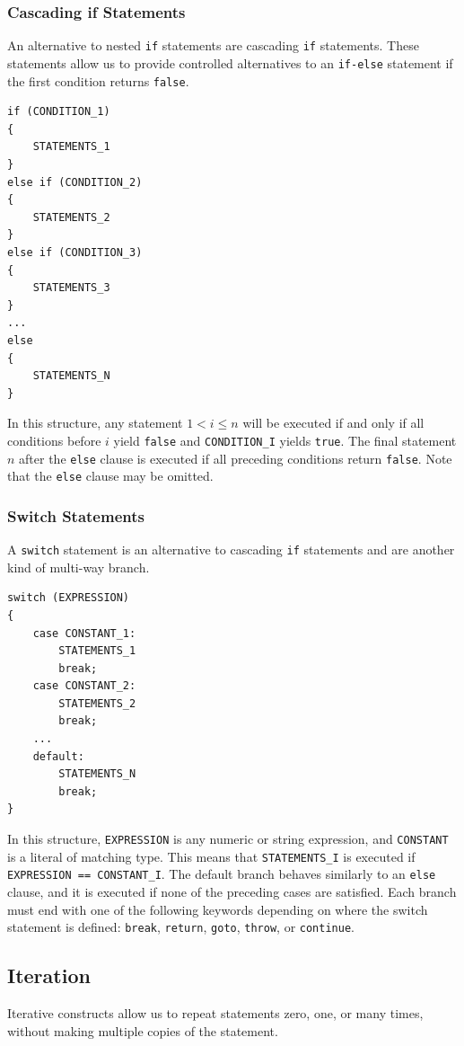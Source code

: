 \documentclass{article}
\begin{document}
\subsubsection{Cascading if Statements}
An alternative to nested \texttt{if} statements are
cascading \texttt{if} statements. These statements allow us
to provide controlled alternatives to an \texttt{if-else}
statement if the first condition returns \texttt{false}.
\begin{verbatim}
if (CONDITION_1)
{
    STATEMENTS_1
}
else if (CONDITION_2)
{
    STATEMENTS_2
}
else if (CONDITION_3)
{
    STATEMENTS_3
}
...
else
{
    STATEMENTS_N
}
\end{verbatim}
In this structure, any statement \(1 < i \leq n\) will be executed if
and only if all conditions before \(i\) yield
\texttt{false} and \texttt{CONDITION_I} yields
\texttt{true}. The final statement \(n\) after the
\texttt{else} clause is executed if all preceding
conditions return \texttt{false}. Note that the
\texttt{else} clause may be omitted.
\subsubsection{Switch Statements}
A \texttt{switch} statement is an alternative to cascading
\texttt{if} statements and are another kind of multi-way
branch.
\begin{verbatim}
switch (EXPRESSION)
{
    case CONSTANT_1:
        STATEMENTS_1
        break;
    case CONSTANT_2:
        STATEMENTS_2
        break;
    ...
    default:
        STATEMENTS_N
        break;
}
\end{verbatim}
In this structure, \texttt{EXPRESSION} is any numeric or
string expression, and \texttt{CONSTANT} is a literal of
matching type. This means that \texttt{STATEMENTS_I} is
executed if \texttt{EXPRESSION == CONSTANT_I}. The default
branch behaves similarly to an \texttt{else} clause, and it
is executed if none of the preceding cases are satisfied. Each branch
must end with one of the following keywords depending on where the
switch statement is defined: \texttt{break},
\texttt{return}, \texttt{goto},
\texttt{throw}, or \texttt{continue}.
\subsection{Iteration}
Iterative constructs allow us to repeat statements zero, one, or many
times, without making multiple copies of the statement.
\end{document}
